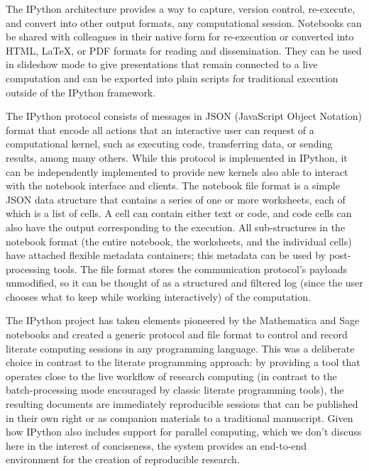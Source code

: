 \documentclass[11pt,oneside,english]{article}
\begin{document}
The IPython architecture provides a way to capture, version control, re-execute,
and convert into other output formats, any computational session.  Notebooks
can be shared with colleagues in their native form for re-execution or
converted into HTML, \LaTeX{}, or PDF formats for reading and dissemination.  They
can be used in slideshow mode to give presentations that remain connected to a
live computation and can be exported into plain scripts for traditional
execution outside of the IPython framework.

The IPython protocol consists of messages in JSON (JavaScript Object Notation)
format that encode all actions that an interactive user can request of a
computational kernel, such as executing code, transferring data, or sending
results, among many others.  While this protocol is implemented in IPython, it
can be independently implemented to provide new kernels also able to interact
with the notebook interface and clients.  The notebook file format is a simple
JSON data structure that contains a series of one or more worksheets, each of
which is a list of cells.  A cell can contain either text or code, and code
cells can also have the output corresponding to the execution.  All
sub-structures in the notebook format (the entire notebook, the worksheets, and
the individual cells) have attached flexible metadata containers; this metadata
can be used by post-processing tools.  The file format stores the communication
protocol's payloads unmodified, so it can be thought of as a structured and
filtered log (since the user chooses what to keep while working interactively)
of the computation.  

The IPython project has taken elements pioneered by the Mathematica and Sage
notebooks and created a generic protocol and file format to control and record
literate computing sessions in any programming language.  This was a deliberate
choice in contrast to the literate programming approach: by providing a tool
that operates close to the live workflow of research computing (in contrast to
the batch-processing mode encouraged by classic literate programming tools),
the resulting documents are immediately reproducible sessions that can be
published in their own right or as companion materials to a traditional
manuscript.  Given how IPython also includes support for parallel computing,
which we don't discuss here in the interest of conciseness, the system provides
an end-to-end environment for the creation of reproducible research.
\end{document}
